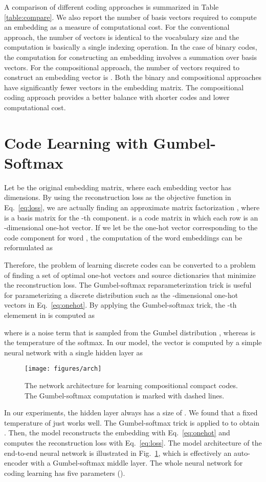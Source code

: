 \documentclass{article} \usepackage{iclr2018_conference_review,times}
\begin{document}
A comparison of different coding approaches is summarized in Table \ref{table:compare}. We also report the number of basis vectors required to compute an embedding as a measure of computational cost. For the conventional approach, the number of vectors is identical to the vocabulary size and the computation is basically a single indexing operation. In the case of binary codes, the computation for constructing an embedding involves a summation over  basis vectors. For the compositional approach, the number of vectors required to construct an embedding vector is . Both the binary and compositional approaches have significantly fewer  vectors in the embedding matrix. The compositional coding approach provides a better balance with shorter codes and lower computational cost.

\section{Code Learning with Gumbel-Softmax}
\label{section:code}

Let  be the original embedding matrix, where each embedding vector has  dimensions.
By using the reconstruction loss as the objective function in Eq.~\ref{eq:loss}, we are actually finding an approximate matrix factorization , where  is a basis matrix for the -th component.  is a  code matrix in which each row is an -dimensional one-hot vector. If we let  be the one-hot vector corresponding to the code component  for word , the computation of the word embeddings can be reformulated as

Therefore, the problem of learning discrete codes  can be converted to a problem of finding a set of optimal one-hot vectors  and source dictionaries  that minimize the reconstruction loss. The Gumbel-softmax reparameterization trick \citep{Maddison2016TheCD,Jang2016CategoricalRW} is useful for parameterizing a discrete distribution such as the -dimensional one-hot vectors  in Eq.~\ref{eq:onehot}. By applying the Gumbel-softmax trick, the -th elemement in  is computed as

where  is a noise term that is sampled from the Gumbel distribution , whereas  is the temperature of the softmax. In our model, the vector  is computed by a simple neural network with a single hidden layer as

\begin{figure}[t]
  \centering
  \texttt{[image: figures/arch]}
  \caption{The network architecture for learning compositional compact codes. The Gumbel-softmax computation is marked with dashed lines.}
  \label{fig:arch}
\end{figure}
In our experiments, the hidden layer  always has a size of . We found that a fixed temperature of  just works well. The Gumbel-softmax trick is applied to  to obtain . Then, the model reconstructs the embedding  with Eq.~\ref{eq:onehot} and computes the reconstruction loss with Eq.~\ref{eq:loss}. The model architecture of the end-to-end neural network is illustrated in Fig.~\ref{fig:arch}, which is effectively an auto-encoder with a Gumbel-softmax middle layer. The whole neural network for coding learning has five parameters ().
\end{document}
